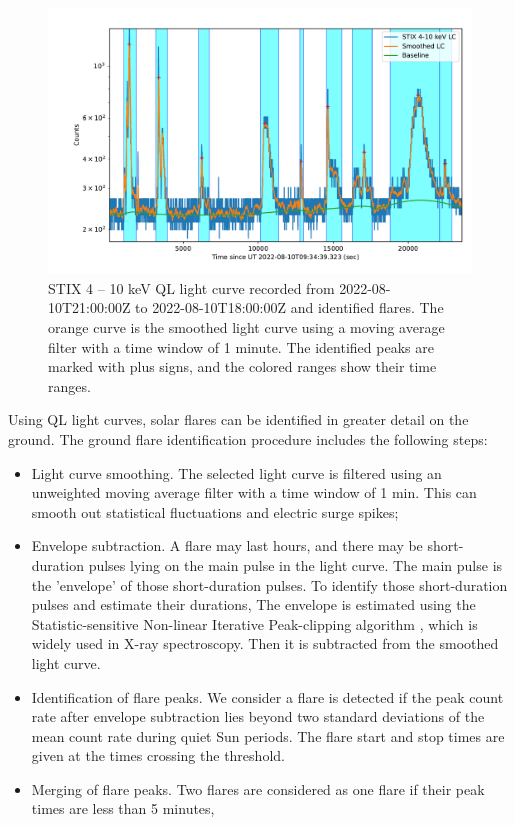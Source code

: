 \documentclass[referee]{aa} %
\begin{document}
\begin{figure}
  \centering
  \includegraphics[width=0.8\linewidth]{figures/flaredet.pdf}
  \caption{STIX 4 -- 10 keV QL light curve recorded from 2022-08-10T21:00:00Z to 2022-08-10T18:00:00Z and 
  identified flares.   The orange curve is the smoothed light curve using a moving average filter with a time window
  of 1 minute.  The identified peaks are marked with plus signs, and the colored ranges show their time ranges.
  }
  \label{fig:flare-det}
\end{figure}
Using QL light curves, solar flares can be identified in greater detail on the ground. 
The ground flare identification procedure includes the following steps:
\begin{itemize}
  \item Light curve smoothing. The selected light curve is filtered using an unweighted
  moving average filter with a time window of 1 min. This can smooth out statistical fluctuations and electric surge spikes;
  \item Envelope subtraction.  
   A flare may last hours, and there may be short-duration pulses lying on the main pulse in the light curve.
   The main pulse is the 'envelope' of those short-duration pulses.
  To identify those short-duration pulses and estimate their durations, 
  The envelope is estimated using the Statistic-sensitive Non-linear Iterative Peak-clipping algorithm \cite{sinp}, which is widely used in X-ray spectroscopy.
    Then it is subtracted from the smoothed light curve.
  \item Identification of flare peaks. We consider a flare is detected 
 if the peak count rate after envelope subtraction lies beyond two standard deviations 
 of the mean count rate during quiet Sun periods. 
  The flare start and stop times are given at the times crossing the threshold.  
  \item Merging of flare peaks. Two flares are considered as one flare if their peak times are less than 5 minutes,
\end{itemize}
\end{document}
